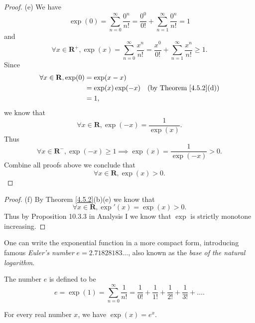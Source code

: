 \begin{proof}{(e)}
    We have
    \[
        \exp(0) = \sum_{n = 0}^\infty \frac{0^n}{n!} = \frac{0^0}{0!} + \sum_{n = 1}^\infty \frac{0^n}{n!} = 1
    \]
    and
    \[
        \forall x \in \mathbf{R}^+, \exp(x) = \sum_{n = 0}^\infty \frac{x^n}{n!} = \frac{x^0}{0!} + \sum_{n = 1}^\infty \frac{x^n}{n!} \geq 1.
    \]
    Since
    \begin{align*}
        \forall x \in \mathbf{R}, \exp(0) & = \exp(x - x)                                           \\
                                          & = \exp(x) \exp(-x) & \text{(by Theorem \ref{4.5.2}(d))} \\
                                          & = 1,
    \end{align*}
    we know that
    \[
        \forall x \in \mathbf{R}, \exp(-x) = \frac{1}{\exp(x)}.
    \]
    Thus
    \[
        \forall x \in \mathbf{R}^-, \exp(-x) \geq 1 \implies \exp(x) = \frac{1}{\exp(-x)} > 0.
    \]
    Combine all proofs above we conclude that
    \[
        \forall x \in \mathbf{R}, \exp(x) > 0.
    \]
\end{proof}

\begin{proof}{(f)}
    By Theorem \ref{4.5.2}(b)(e) we know that
    \[
        \forall x \in \mathbf{R}, \exp'(x) = \exp(x) > 0.
    \]
    Thus by Proposition 10.3.3 in Analysis I we know that \(\exp\) is strictly monotone increasing.
\end{proof}

\begin{note}
    One can write the exponential function in a more compact form, introducing famous \emph{Euler's number} \(e = 2.71828183 \dots\), also known as the \emph{base of the natural logarithm}.
\end{note}

\begin{definition}\label{4.5.3}
    The number \(e\) is defined to be
    \[
        e = \exp(1) = \sum_{n = 0}^\infty \frac{1}{n!} = \frac{1}{0!} + \frac{1}{1!} + \frac{1}{2!} + \frac{1}{3!} + \dots.
    \]
\end{definition}

\begin{proposition}\label{4.5.4}
    For every real number \(x\), we have \(\exp(x) = e^x\).
\end{proposition}

